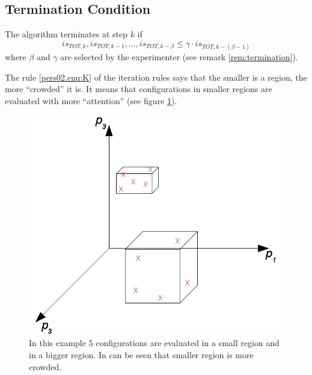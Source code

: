 \subsection{Termination Condition}
The algorithm terminates at step $k$ if
\[
is_{TOT,k},is_{TOT,k-1},\dots,is_{TOT,k-\beta}\le\gamma\cdot is_{TOT,k-\left(\beta-1\right)}
\]
 where $\beta$ and $\gamma$ are selected by the experimenter (see
remark \ref{rem:termination}).
\begin{remark}
\label{pers02.rem:smaller_regions}The rule \ref{pers02.enu:K} of
the iteration rules says that the smaller is a region, the more ``crowded''
it is. It means that configurations in smaller regions are evaluated
with more ``attention'' (see figure \ref{pers02.fig:small_and_big}).

\begin{figure}[h]
\includegraphics[width=0.5\columnwidth]{img/small_and_big}

\caption{\label{pers02.fig:small_and_big}In this example 5 configurations
are evaluated in a small region and in a bigger region. In can be
seen that smaller region is more crowded.}


\end{figure}

\end{remark}

